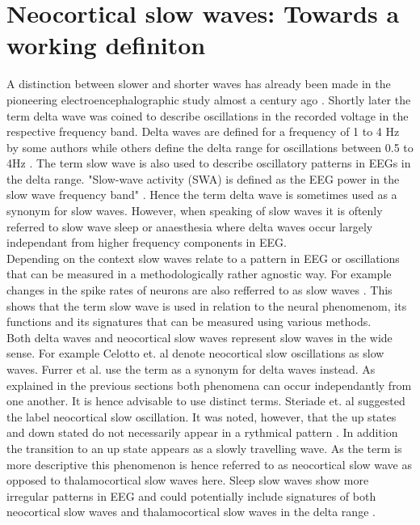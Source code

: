 \section{Neocortical slow waves: Towards a working definiton}
\label{working_definition}
A distinction between slower and shorter waves has already been made in the pioneering electroencephalographic study almost a century ago \parencite[p. 550]{berger1929}. Shortly later the term delta wave was coined to describe oscillations in the recorded voltage in the respective frequency band. Delta waves are defined for a frequency of 1 to 4 Hz by some authors \parencite{kubin2019interactions} while others define the delta range for oscillations between 0.5 to 4Hz \parencite{dossi1992electrophysiology}. The term slow wave is also used to describe oscillatory patterns in EEGs in the delta range. "Slow-wave activity (SWA) is defined as the EEG power in the slow wave frequency band" \parencite[p. 1]{furrer2019sleep}. Hence the term delta wave is sometimes used as a synonym for slow waves. However, when speaking of slow waves it is oftenly referred to slow wave sleep or anaesthesia where delta waves occur largely independant from higher frequency components in EEG.\\
Depending on the context slow waves relate to a pattern in EEG or oscillations that can be measured in a methodologically rather agnostic way. For example changes in the spike rates of neurons are also refferred to as slow waves \parencite{jercog2017up}. This shows that the term slow wave is used in relation to the neural phenomenom, its functions and its signatures that can be measured using various methods.\\
Both delta waves and neocortical slow waves represent slow waves in the wide sense. For example Celotto et. al \parencite*{celotto2020analysis} denote neocortical slow oscillations as slow waves. Furrer et al. \parencite*{furrer2019sleep} use the term as a synonym for delta waves instead. As explained in the previous sections both phenomena can occur independantly from one another. It is hence advisable to use distinct terms. Steriade et. al \parencite*{steriade1993novel} suggested the label neocortical slow oscillation. It was noted, however, that the up states and down stated do not necessarily appear in a rythmical pattern \parencite{brown2012control}. In addition the transition to an up state appears as a slowly travelling wave. As the term is more descriptive this phenomenon is hence referred to as neocortical slow wave as opposed to thalamocortical slow waves here. Sleep slow waves show more irregular patterns in EEG and could potentially include signatures of both neocortical slow waves and thalamocortical slow waves in the delta range \parencite{steriade1993novel}.\\
